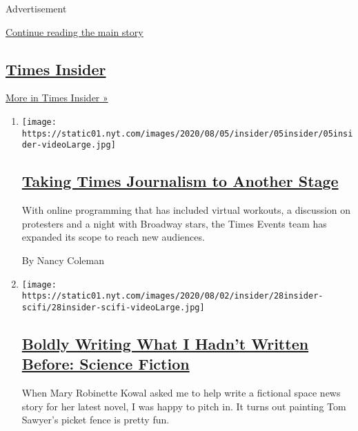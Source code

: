 Advertisement

\protect\hyperlink{after-mid1}{Continue reading the main story}

\hypertarget{times-insider-3}{%
\subsection{\texorpdfstring{\href{/series/times-insider}{Times
Insider}}{Times Insider}}\label{times-insider-3}}

\href{/series/times-insider}{More in Times Insider »}

\begin{enumerate}
\def\labelenumi{\arabic{enumi}.}
\item
  \texttt{[image: https://static01.nyt.com/images/2020/08/05/insider/05insider/05insider-videoLarge.jpg]}

  \hypertarget{taking-times-journalism-to-another-stage}{%
  \subsection{\texorpdfstring{\href{/2020/08/05/insider/times-events.html}{Taking
  Times Journalism to Another
  Stage}}{Taking Times Journalism to Another Stage}}\label{taking-times-journalism-to-another-stage}}

  With online programming that has included virtual workouts, a
  discussion on protesters and a night with Broadway stars, the Times
  Events team has expanded its scope to reach new audiences.

  By Nancy Coleman
\item
  \texttt{[image: https://static01.nyt.com/images/2020/08/02/insider/28insider-scifi/28insider-scifi-videoLarge.jpg]}

  \hypertarget{boldly-writing-what-i-hadnt-written-before-science-fiction}{%
  \subsection{\texorpdfstring{\href{/2020/07/28/insider/science-fiction-novel-mary-robinette-kowal.html}{Boldly
  Writing What I Hadn't Written Before: Science
  Fiction}}{Boldly Writing What I Hadn't Written Before: Science Fiction}}\label{boldly-writing-what-i-hadnt-written-before-science-fiction}}

  When Mary Robinette Kowal asked me to help write a fictional space
  news story for her latest novel, I was happy to pitch in. It turns out
  painting Tom Sawyer's picket fence is pretty fun.


\end{enumerate}
